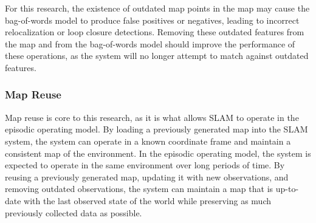 For this research, the existence of outdated map points in the map may cause the bag-of-words model to produce false positives or negatives, leading to incorrect relocalization or loop closure detections. Removing these outdated features from the map and from the bag-of-words model should improve the performance of these operations, as the system will no longer attempt to match against outdated features.

\subsubsection{Map Reuse}

Map reuse is core to this research, as it is what allows SLAM to operate in the episodic operating model. By loading a previously generated map into the SLAM system, the system can operate in a known coordinate frame and maintain a consistent map of the environment. In the episodic operating model, the system is expected to operate in the same environment over long periods of time. By reusing a previously generated map, updating it with new observations, and removing outdated observations, the system can maintain a map that is up-to-date with the last observed state of the world while preserving as much previously collected data as possible.
